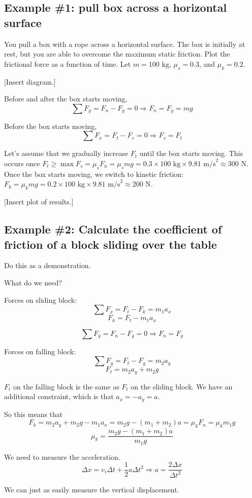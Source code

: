 \subsection{Example \#1: pull box across a horizontal surface}
You pull a box with a rope across a horizontal surface. The box is initially at rest, but you are able to overcome the maximum static friction. Plot the frictional force as a function of time. Let $m=100\mbox{ kg}$, $\mu_s=0.3$, and $\mu_k=0.2$.

[Insert diagram.]
\vspace{5cm}

Before and after the box starts moving,
$$\sum F_y = F_n-F_g=0\Rightarrow F_n=F_g=mg$$

Before the box starts moving,
$$\sum F_x=F_t-F_s=0\Rightarrow F_s=F_t$$

Let's assume that we gradually increase $F_t$ until the box starts moving. This occurs once $F_t\geq \max F_s=\mu_s F_n=\mu_s mg=0.3\times 100\mbox{ kg}\times 9.81\mbox{ m/s}^2\approx 300\mbox{ N}$. Once the box starts moving, we switch to kinetic friction: $F_k=\mu_k mg=0.2\times 100\mbox{ kg}\times 9.81\mbox{ m/s}^2\approx 200\mbox{ N}$.

[Insert plot of results.]
\vspace{5cm}

\subsection{Example \#2: Calculate the coefficient of friction of a block sliding over the table}
Do this as a demonstration.

What do we need?

Forces on sliding block:
$$\sum F_x=F_t-F_k=m_1a_x$$
$$F_k=F_t-m_1a_x$$

$$\sum F_y=F_n-F_g=0\Rightarrow F_n=F_g$$

Forces on falling block:
$$\sum F_y=F_t-F_g=m_2a_y$$
$$F_t=m_2a_y+m_2g$$

$F_t$ on the falling block is the same as $F_t$ on the sliding block. We have an additional constraint, which is that $a_x=-a_y=a$.

So this means that
$$F_k=m_2a_y+m_2g-m_1a_x=m_2g-(m_1+m_2)a=\mu_kF_n=\mu_km_1g$$
$$\mu_k=\frac{m_2g-(m_1+m_2)a}{m_1g}$$

We need to measure the acceleration.
$$\Delta{x}=v_i\Delta{t}+\frac{1}{2}a\Delta{t}^2\Rightarrow a=\frac{2\Delta{x}}{\Delta{t}^2}$$

We can just as easily measure the vertical displacement.



\clearpage
